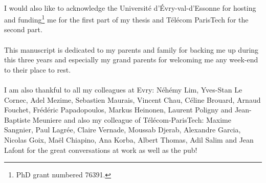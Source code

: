 \paragraph{}
I would also like to acknowledge the Universit\'e d'\'Evry-val-d'Essonne for
hosting and funding\footnote{PhD grant numbered 76391.} me for the first part
of my thesis and T\'el\'ecom ParisTech for the second part.
\paragraph{}
This manuscript is dedicated to my parents and family for backing me up during
this three years and especially my grand parents for welcoming me any week-end
to their place to rest.
\paragraph{}
I am also thankful to all my colleagues at Evry: N\'eh\'emy Lim, Yves-Stan Le
Cornec, Adel Mezime, Sebastien Maurais, Vincent Chau, C\'eline Brouard, Arnaud
Fouchet, Fr\'ed\'eric Papadopoulos, Markus Heinonen, Laurent Poligny and
Jean-Baptiste Meuniere and also my colleague of T\'el\'ecom-ParisTech: Maxime
Sangnier, Paul Lagr\'ee, Claire Vernade, Moussab Djerab, Alexandre Garcia,
Nicolas Goix, Ma\"el Chiapino, Ana Korba, Albert Tho\-mas, Adil Salim and Jean
Lafont for the great conversations at work as well as the pub!

\endgroup

\chapterend

